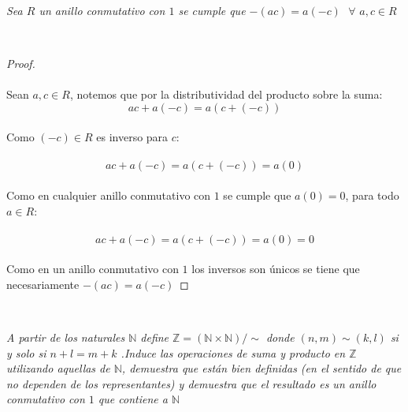 \documentclass[11pt,letterpaper]{article}
\newcommand{\N}{\mathbb{N}}
\newcommand{\Z}{\mathbb{Z}}
\begin{document}
\,\\
\begin{tcolorbox}[
	title = \textcolor{black}{\textcolor{white}{Lema 1}},]
\textit{Sea $R$ un anillo conmutativo con $1$ se cumple que $-(ac)=a(-c)\,\,\,\,\forall\,\,a,c\in R$
}
\end{tcolorbox}\,\\
\begin{proof}\,\\
    \,\\
    Sean $a,c\in R$, notemos que por la distributividad del producto sobre la suma:\,\\
        \begin{equation*}
           ac+a(-c)=a(c+(-c))
        \end{equation*}\,\\
        Como $(-c)\in R$ es inverso para $c$:\,\\
        \,\\
        \begin{equation*}
            ac+a(-c)=a(c+(-c))=a(0)
        \end{equation*}\,\\
        Como en cualquier anillo conmutativo con $1$ se cumple que $a(0)=0$, para todo $a\in R$:\,\\
        \,\\
        \begin{equation*}
            ac+a(-c)=a(c+(-c))=a(0)=0
        \end{equation*}\,\\
        Como en un anillo conmutativo con $1$ los inversos son \'unicos se tiene que necesariamente $-(ac)=a(-c)$
\end{proof}\,\\
\newpage
\begin{tcolorbox}[
	title = \textcolor{black}{\textcolor{white}{Problema 1}},]
\textit{A partir de los naturales $\N$ define $\Z=(\N\times \N)/\sim$ donde $(n,m)\sim(k,l)$ si y solo si $n+l=m+k$
.Induce las operaciones de suma y producto en $\Z$ utilizando aquellas de $\N$, demuestra que est\'an bien definidas 
(en el sentido de que no dependen de los representantes) y demuestra que el resultado es un anillo conmutativo con $1$ que 
contiene  a $\N$ 
}
\end{tcolorbox}\,\\
\end{document}
